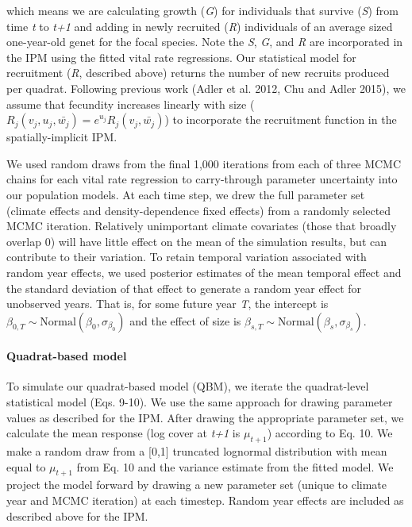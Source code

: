 \documentclass[12pt,]{article}
\begin{document}
which means we are calculating growth (\emph{G}) for individuals that
survive (\emph{S}) from time \emph{t} to \emph{t+1} and adding in newly
recruited (\emph{R}) individuals of an average sized one-year-old genet
for the focal species. Note the \emph{S}, \emph{G}, and \emph{R} are
incorporated in the IPM using the fitted vital rate regressions. Our
statistical model for recruitment (\emph{R}, described above) returns
the number of new recruits produced per quadrat. Following previous work
(Adler et al. 2012, Chu and Adler 2015), we assume that fecundity
increases linearly with size
(\(R_j(v_{j},u_{j},\bar{w_{j}}) = e^{u_j}R_j(v_{j},\bar{w_{j}})\)) to
incorporate the recruitment function in the spatially-implicit IPM.

We used random draws from the final 1,000 iterations from each of three
MCMC chains for each vital rate regression to carry-through parameter
uncertainty into our population models. At each time step, we drew the
full parameter set (climate effects and density-dependence fixed
effects) from a randomly selected MCMC iteration. Relatively unimportant
climate covariates (those that broadly overlap 0) will have little
effect on the mean of the simulation results, but can contribute to
their variation. To retain temporal variation associated with random
year effects, we used posterior estimates of the mean temporal effect
and the standard deviation of that effect to generate a random year
effect for unobserved years. That is, for some future year \emph{T}, the
intercept is
\(\beta_{0,T} \sim \text{Normal}(\beta_0, \sigma_{\beta_0})\) and the
effect of size is
\(\beta_{s,T} \sim \text{Normal}(\beta_s, \sigma_{\beta_s})\).

\paragraph{Quadrat-based model}\label{quadrat-based-model}

To simulate our quadrat-based model (QBM), we iterate the quadrat-level
statistical model (Eqs. 9-10). We use the same approach for drawing
parameter values as described for the IPM. After drawing the appropriate
parameter set, we calculate the mean response (log cover at \emph{t+1}
is \(\mu_{t+1}\)) according to Eq. 10. We make a random draw from a
{[}0,1{]} truncated lognormal distribution with mean equal to
\(\mu_{t+1}\) from Eq. 10 and the variance estimate from the fitted
model. We project the model forward by drawing a new parameter set
(unique to climate year and MCMC iteration) at each timestep. Random
year effects are included as described above for the IPM.
\end{document}
